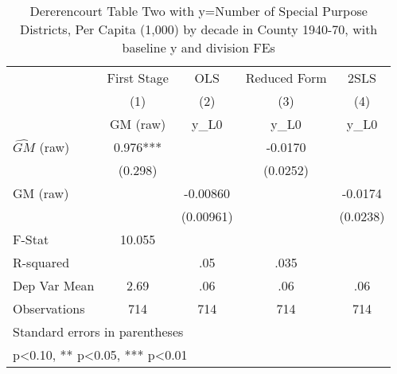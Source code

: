 \begin{table}[htbp]\centering
\def\sym#1{\ifmmode^{#1}\else\(^{#1}\)\fi}
\caption{Dererencourt Table Two with y=Number of Special Purpose Districts, Per Capita (1,000) by decade in County 1940-70, with baseline y and division FEs}
\begin{tabular}{l*{4}{c}}
\toprule
                    & First Stage   &         OLS   &Reduced Form   &        2SLS   \\
                    &\multicolumn{1}{c}{(1)}&\multicolumn{1}{c}{(2)}&\multicolumn{1}{c}{(3)}&\multicolumn{1}{c}{(4)}\\
                    &\multicolumn{1}{c}{GM  (raw)}&\multicolumn{1}{c}{y\_L0}&\multicolumn{1}{c}{y\_L0}&\multicolumn{1}{c}{y\_L0}\\
\midrule
$\hat{GM}$ (raw)    &       0.976***&               &     -0.0170   &               \\
                    &     (0.298)   &               &    (0.0252)   &               \\
\addlinespace
GM  (raw)           &               &    -0.00860   &               &     -0.0174   \\
                    &               &   (0.00961)   &               &    (0.0238)   \\
\midrule
F-Stat              &      10.055   &               &               &               \\
R-squared           &               &         .05   &        .035   &               \\
Dep Var Mean        &        2.69   &         .06   &         .06   &         .06   \\
Observations        &         714   &         714   &         714   &         714   \\
\bottomrule
\multicolumn{5}{l}{\footnotesize Standard errors in parentheses}\\
\multicolumn{5}{l}{\footnotesize * p<0.10, ** p<0.05, *** p<0.01}\\
\end{tabular}
\end{table}
